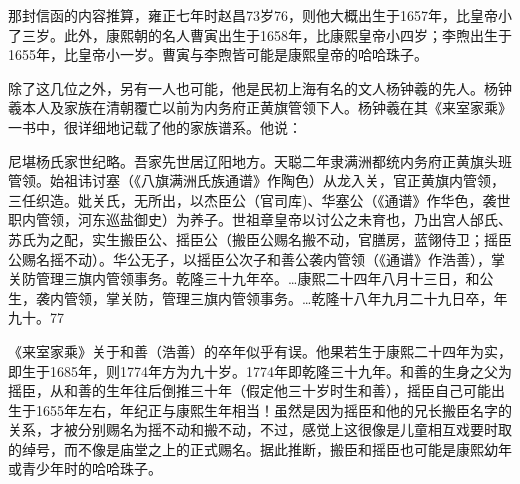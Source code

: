 \vfill
\begin{BookNotes}
\end{BookNotes}

\noindent 那封信函的内容推算，雍正七年时赵昌73岁76，则他大概出生于1657年，比皇帝小了三岁。此外，康熙朝的名人曹寅出生于1658年，比康熙皇帝小四岁；李煦出生于1655年，比皇帝小一岁。曹寅与李煦皆可能是康熙皇帝的哈哈珠子。

除了这几位之外，另有一人也可能，他是民初上海有名的文人杨钟羲的先人。杨钟羲本人及家族在清朝覆亡以前为内务府正黄旗管领下人。杨钟羲在其《来室家乘》一书中，很详细地记载了他的家族谱系。他说：

\begin{BookQuote}
尼堪杨氏家世纪略。吾家先世居辽阳地方。天聪二年隶满洲都统内务府正黄旗头班管领。始祖讳讨塞（《八旗满洲氏族通谱》作陶色）从龙入关，官正黄旗内管领，三任织造。妣关氏，无所出，以杰臣公（官司库)、华塞公（《通谱》作华色，袭世职内管领，河东巡盐御史）为养子。世祖章皇帝以讨公之未育也，乃出宫人邰氏、苏氏为之配，实生搬臣公、摇臣公（搬臣公赐名搬不动，官膳房，蓝翎侍卫；摇臣公赐名摇不动）。华公无子，以摇臣公次子和善公袭内管领（《通谱》作浩善），掌关防管理三旗内管领事务。乾隆三十九年卒。…康熙二十四年八月十三日，和公生，袭内管领，掌关防，管理三旗内管领事务。…乾隆十八年九月二十九日卒，年九十。77
\end{BookQuote}

《来室家乘》关于和善（浩善）的卒年似乎有误。他果若生于康熙二十四年为实，即生于1685年，则1774年方为九十岁。1774年即乾隆三十九年。和善的生身之父为摇臣，从和善的生年往后倒推三十年（假定他三十岁时生和善），摇臣自己可能出生于1655年左右，年纪正与康熙生年相当！虽然是因为摇臣和他的兄长搬臣名字的关系，才被分别赐名为摇不动和搬不动，不过，感觉上这很像是儿童相互戏要时取的绰号，而不像是庙堂之上的正式赐名。据此推断，搬臣和摇臣也可能是康熙幼年或青少年时的哈哈珠子。

\vfill
\begin{BookNotes}
\end{BookNotes}

